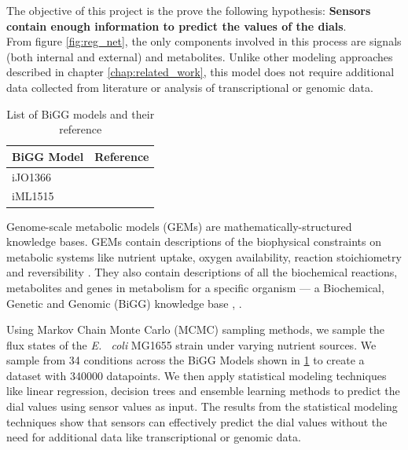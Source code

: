 \documentclass[12pt,chapterheads]{ucsd}
\begin{document}
The objective of this project is the prove the following hypothesis:
\textbf{Sensors contain enough information to predict the values of the dials}.\\
From figure \ref{fig:reg_net}, the only components involved in this process are signals (both internal and external) and metabolites. Unlike other modeling approaches described in chapter \ref{chap:related_work}, this model does not require additional data collected from literature or analysis of transcriptional or genomic data.

\vspace{0.25in}
\begin{table}[!ht]
\caption[BiGG models]{List of BiGG models and their reference}

\vspace{-0.25in}
\begin{center}
\begin{tabular}{|p{1in}|p{1in}|}
\hline
BiGG Model  & Reference \\

\hline
iJO1366 & \cite{Orth535} \\

\hline
iML1515 & \cite{Monk2017} \\

\hline

\end{tabular}
\end{center}
\label{tab:bigg}
\end{table}

Genome-scale metabolic models (GEMs) are mathematically-structured knowledge bases. GEMs contain descriptions of the biophysical constraints on metabolic systems like nutrient uptake, oxygen availability, reaction stoichiometry and reversibility \cite{pmid19116616}. They also contain descriptions of all the biochemical reactions, metabolites and genes in metabolism for a specific organism — a Biochemical, Genetic and Genomic (BiGG) knowledge base \cite{pmid19116616}, \cite{doi:10.1093/nar/gkv1049}.  

Using Markov Chain Monte Carlo (MCMC) sampling methods, we sample the flux states of the \textit{E. ~coli} MG1655 strain under varying nutrient sources. We sample from 34 conditions across the BiGG Models shown in \ref{tab:bigg} to create a dataset with 340000 datapoints. We then apply statistical modeling techniques like linear regression, decision trees and ensemble learning methods to predict the dial values using sensor values as input. The results from the statistical modeling techniques show that sensors can effectively predict the dial values without the need for additional data like transcriptional or genomic data.
\end{document}
